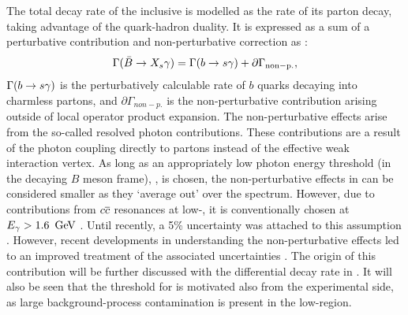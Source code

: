 The total decay rate of the inclusive \BtoXsgamma is modelled as the rate of its parton decay, taking advantage of the quark-hadron duality.
It is expressed as a sum of a perturbative contribution and non-perturbative correction as \cite{Misiak:2015xwa}:
\begin{equation}\label{eq:btosgammarate_nonp}
    \Gamma(\bar{B}\rightarrow X_s\gamma) = \Gamma(b\rightarrow s\gamma) + \partial\Gamma_{\mathrm{non-p.}},
\end{equation}
$\Gamma(b\rightarrow s\gamma)$ is the perturbatively calculable rate of $b$ quarks decaying into charmless partons, and $\partial\Gamma_{non-p.}$ is the non-perturbative contribution arising outside of local operator product expansion.
The non-perturbative effects arise from the so-called resolved photon contributions.
These contributions are a result of the photon coupling directly to partons instead of the effective weak interaction vertex.
As long as an appropriately low photon energy threshold (in the decaying $B$ meson frame), \EB, is chosen, the non-perturbative effects in  can be considered smaller as they `average out' over the spectrum.
However, due to contributions from $c\overline c$ resonances at low-\Egamma, it is conventionally chosen at ${E_{\gamma}}>1.6~\mathrm{\,Ge\kern -0.1em V}$ \cite{Misiak:2009nr}.
Until recently, a 5\% uncertainty was attached to this assumption \cite{Benzke:2010js}. 
However, recent developments in understanding the non-perturbative effects \cite{Gunawardana:2019gep} led to an improved treatment of the associated uncertainties \cite{Misiak:2020vlo}.
The origin of this contribution will be further discussed with the differential decay rate in .
It will also be seen that the threshold for \EB is motivated also from the experimental side, as large background-process contamination is present in the low-\EB region.

